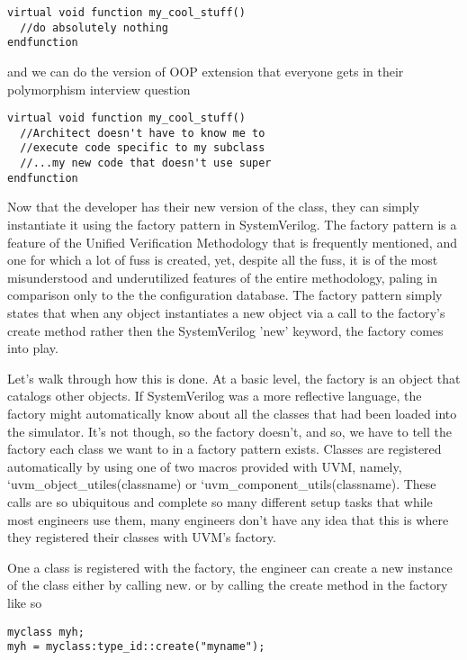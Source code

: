 \documentclass[twocolumn,letterpaper]{IEEEAerospaceCLS}  %
\begin{document}
\verb|virtual void function my_cool_stuff() |
\\
\verb|  //do absolutely nothing|
\\
\verb|endfunction|

and we can do the version of OOP extension that everyone gets in their polymorphism interview question

\verb|virtual void function my_cool_stuff() |
\\
\verb|  //Architect doesn't have to know me to|
\\
\verb|  //execute code specific to my subclass|
\\
\verb|  //...my new code that doesn't use super|
\\
\verb|endfunction|



Now that the developer has their new version of the class, they can simply instantiate it using the factory pattern in SystemVerilog. The factory pattern is a feature of the Unified Verification Methodology that is frequently mentioned, and one for which a lot of fuss is created, yet, despite all the fuss, it is of the most misunderstood and underutilized features of the entire methodology, paling in comparison only to the the configuration database. The factory pattern simply states that when any object instantiates a new object via a call to the factory's create method  rather then the SystemVerilog 'new' keyword, the factory comes into play. 

Let's walk through how this is done. At a basic level, the factory is an object that catalogs other objects. If SystemVerilog was a more reflective language, the factory might automatically know about all the classes that had been loaded into the simulator. It's not though, so the factory doesn't, and so, we have to tell the factory each class we want to in a factory pattern exists. Classes are registered automatically by using one of two macros provided with UVM, namely, `uvm\_object\_utiles(classname) or `uvm\_component\_utils(classname). These calls are so ubiquitous and complete so many different setup tasks that while most engineers use them, many engineers don't have any idea that this is where they registered their classes with UVM's factory.

One a class is registered with the factory, the engineer can create a new instance of the class either by calling new. or by calling the create method in the factory like so

\verb|myclass myh; |
\\
\verb|myh = myclass:type_id::create("myname");|
\end{document}
